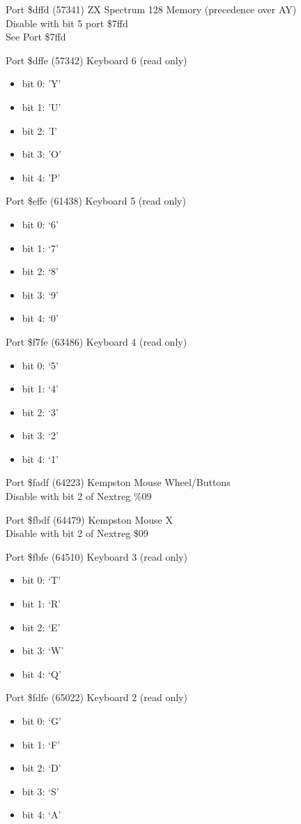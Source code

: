 Port \$dffd (57341) ZX Spectrum 128 Memory (precedence over AY)\\
Disable with bit 5 port \$7ffd\\
See Port \$7ffd

Port \$dffe (57342) Keyboard 6 (read only)
\begin{itemize}
\item[] bit 0: 'Y'
\item[] bit 1: 'U'
\item[] bit 2: 'I'
\item[] bit 3: 'O'
\item[] bit 4: 'P'
\end{itemize}

Port \$effe (61438) Keyboard 5 (read only)
\begin{itemize}
\item[] bit 0: ‘6’
\item[] bit 1: ‘7’
\item[] bit 2: ‘8’
\item[] bit 3: ‘9’
\item[] bit 4: ‘0’
\end{itemize}

Port \$f7fe (63486) Keyboard 4 (read only)
\begin{itemize}
\item[] bit 0: ‘5’
\item[] bit 1: ‘4’
\item[] bit 2: ‘3’
\item[] bit 3: ‘2’
\item[] bit 4: ‘1’
\end{itemize}

Port \$fadf (64223) Kempston Mouse Wheel/Buttons\\
Disable with bit 2 of Nextreg \%09

Port \$fbdf (64479) Kempston Mouse X\\
Disable with bit 2 of Nextreg \$09

Port \$fbfe (64510) Keyboard 3 (read only)
\begin{itemize}
\item[] bit 0: ‘T’
\item[] bit 1: ‘R’
\item[] bit 2: ‘E’
\item[] bit 3: ‘W’
\item[] bit 4: ‘Q’
\end{itemize}

Port \$fdfe (65022) Keyboard 2 (read only)
\begin{itemize}
\item[] bit 0: ‘G’
\item[] bit 1: ‘F’
\item[] bit 2: ‘D’
\item[] bit 3: ‘S’
\item[] bit 4: ‘A’
\end{itemize}

